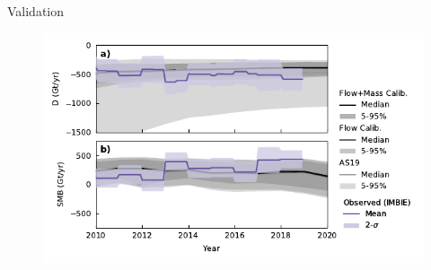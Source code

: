 \documentclass[aspectratio=169,hide notes,intlimits]{beamer}
\begin{document}
\begin{frame}{Validation}
    \begin{figure}
      \includegraphics[width=.75\textwidth]{historical_partitioning_calibrated}
    \end{figure}
\end{frame}
\end{document}
